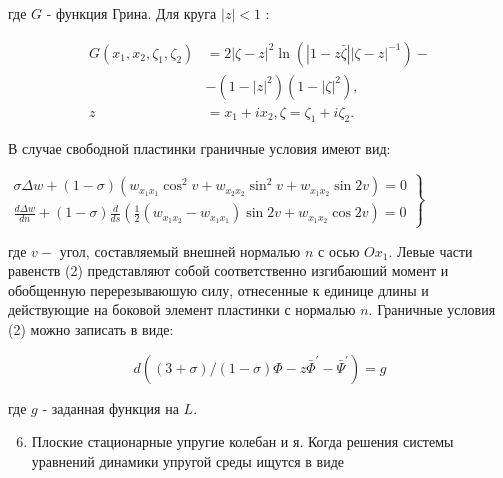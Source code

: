 \documentclass[10pt]{article}
\begin{document}
где $G$ - функция Грина. Для круга $|z|<1$ :



\[

\begin{aligned}

G\left(x_{1}, x_{2}, \zeta_{1}, \zeta_{2}\right) & =2|\zeta-z|^{2} \ln \left(|1-z \bar{\zeta}||\zeta-z|^{-1}\right)- \\

& -\left(1-|z|^{2}\right)\left(1-|\zeta|^{2}\right), \\

z & =x_{1}+i x_{2}, \zeta=\zeta_{1}+i \zeta_{2} .

\end{aligned}

\]



В случае свободной пластинки граничные условия имеют вид:



$\left.\begin{array}{l}\sigma \Delta w+(1-\sigma)\left(w_{x_{1} x_{1}} \cos ^{2} v+w_{x_{2} x_{2}} \sin ^{2} v+w_{x_{1} x_{2}} \sin 2 v\right)=0 \\ \frac{d \Delta w}{d n}+(1-\sigma) \frac{d}{d s}\left(\frac{1}{2}\left(w_{x_{1} x_{2}}-w_{x_{1} x_{1}}\right) \sin 2 v+w_{x_{1} x_{2}} \cos 2 v\right)=0\end{array}\right\}$



где $v-$ угол, составляемый внешней нормалью $n$ с осью $O x_{1}$. Левые части равенств (2) представляют собой соответственно изгибаюший момент и обобщенную перерезываюшую силу, отнесенные к единице длины и действующие на боковой элемент пластинки с нормалью $n$. Граничные условия (2) можно записать в виде:



\[

d\left((3+\sigma) /(1-\sigma) \Phi-z \bar{\Phi}^{\prime}-\bar{\Psi}^{\prime}\right)=g

\]



где $g$ - заданная функция на $L$.



\begin{enumerate}

  \setcounter{enumi}{5}

  \item Плоские стационарные упругие колебан и я. Когда решения системы уравнений динамики упругой среды ищутся в виде

\end{enumerate}
\end{document}
